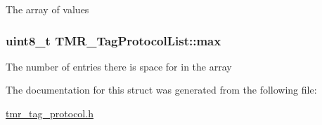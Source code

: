 The array of values \hypertarget{struct_t_m_r___tag_protocol_list_c0261e3e136c45da1d323439fb359f3d}{
\subsubsection[{max}]{\setlength{\rightskip}{0pt plus 5cm}uint8\_\-t {\bf TMR\_\-TagProtocolList::max}}}
\label{struct_t_m_r___tag_protocol_list_c0261e3e136c45da1d323439fb359f3d}


The number of entries there is space for in the array 

The documentation for this struct was generated from the following file:\begin{CompactItemize}
\item 
\hyperlink{tmr__tag__protocol_8h}{tmr\_\-tag\_\-protocol.h}\end{CompactItemize}
